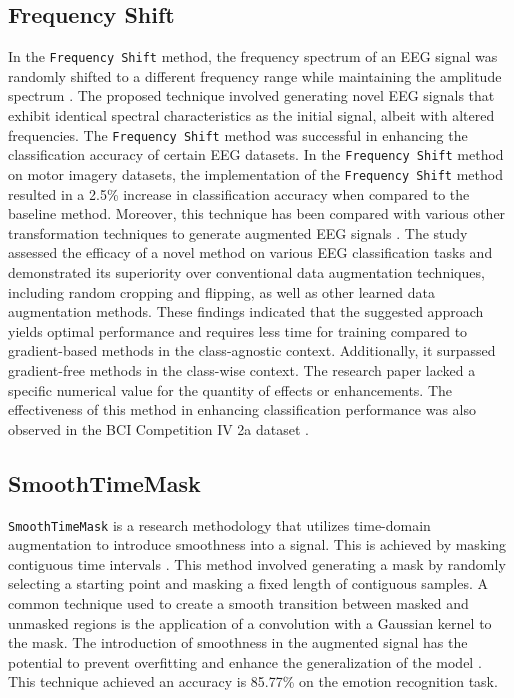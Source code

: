 \subsection{Frequency Shift}
In the \texttt{Frequency Shift} method, the frequency spectrum of an EEG signal was randomly shifted to a different frequency range while maintaining the amplitude spectrum \cite{rommel2022data}.
The proposed technique involved generating novel EEG signals that exhibit identical spectral characteristics as the initial signal, albeit with altered frequencies. 
The \texttt{Frequency Shift} method was successful in enhancing the classification accuracy of certain EEG datasets. 
In the \texttt{Frequency Shift} method on motor imagery datasets, the implementation of the \texttt{Frequency Shift} method resulted in a 2.5\% increase in classification accuracy when compared to the baseline method. 
Moreover, this technique has been compared with various other transformation techniques to generate augmented EEG signals \cite{rommel2021cadda}.
The study assessed the efficacy of a novel method on various EEG classification tasks and demonstrated its superiority over conventional data augmentation techniques, including random cropping and flipping, as well as other learned data augmentation methods. 
These findings indicated that the suggested approach yields optimal performance and requires less time for training compared to gradient-based methods in the class-agnostic context.
Additionally, it surpassed gradient-free methods in the class-wise context.
The research paper lacked a specific numerical value for the quantity of effects or enhancements. 
The effectiveness of this method in enhancing classification performance was also observed in the BCI Competition IV 2a dataset \cite{brunner2008bci}.
 
\subsection{SmoothTimeMask}
\texttt{SmoothTimeMask} is a research methodology that utilizes time-domain augmentation to introduce smoothness into a signal. 
This is achieved by masking contiguous time intervals \cite{mohsenvand2020contrastive}.
This method involved generating a mask by randomly selecting a starting point and masking a fixed length of contiguous samples.
A common technique used to create a smooth transition between masked and unmasked regions is the application of a convolution with a Gaussian kernel to the mask.
The introduction of smoothness in the augmented signal has the potential to prevent overfitting and enhance the generalization of the model \cite{mohsenvand2020contrastive}.
This technique achieved an accuracy is 85.77\% on the emotion recognition task. 

